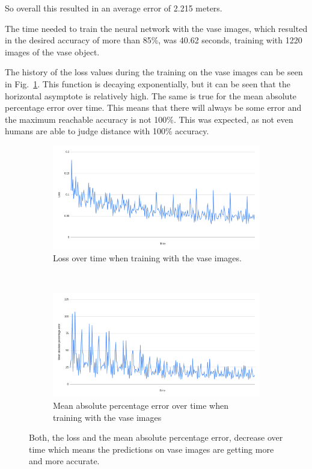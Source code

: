 So overall this resulted in an average error of 2.215 meters.

The time needed to train the neural network with the vase images, which resulted in the desired accuracy of more than 85\%, was 40.62 seconds, training with 1220 images of the vase object.

The history of the loss values during the training on the vase images can be seen in Fig.~\ref{pic:experiment1_results_loss_and_percentageLoss}. This function is decaying exponentially, but it can be seen that the horizontal asymptote is relatively high. The same is true for the mean absolute percentage error over time. This means that there will always be some error and the maximum reachable accuracy is not 100\%. This was expected, as not even humans are able to judge distance with 100\% accuracy.

\begin{figure}[h!]
	\centering
	\begin{subfigure}[t]{\textwidth}
		\centering
		\includegraphics[width=\textwidth]{img/experiment1_results_lossOverTime.png}
		\caption{Loss over time when training with the vase images.}
	\end{subfigure}
	~ 
	\begin{subfigure}[t]{\textwidth}
		\centering
		\includegraphics[width=\textwidth]{img/experiment1_results_MeanAbsolutePercentageErrorOverTime.png}
		\caption{Mean absolute percentage error over time when training with the vase images}
	\end{subfigure}
	\caption{Both, the loss and the mean absolute percentage error, decrease over time which means the predictions on vase images are getting more and more accurate.}
	\label{pic:experiment1_results_loss_and_percentageLoss}
\end{figure}

